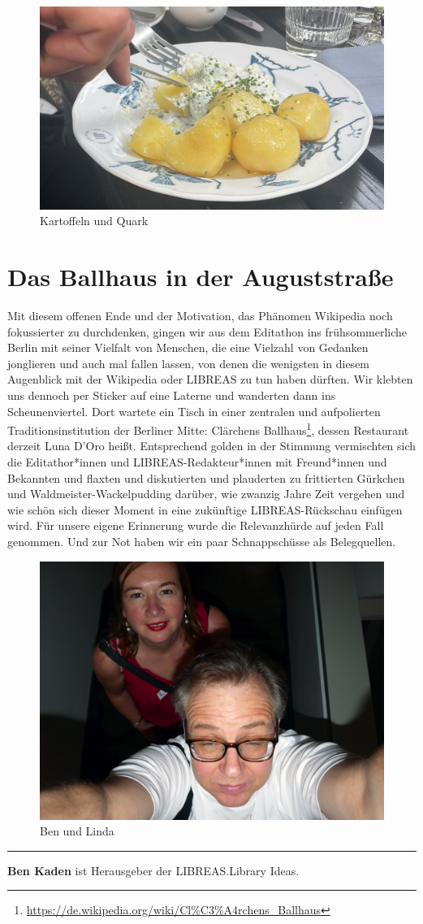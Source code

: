 \documentclass[a4paper,
fontsize=11pt,
oneside,
numbers=noperiodatend,
parskip=half-,
bibliography=totoc,
final
]{scrartcl}
\begin{document}
\begin{figure}[H]
\centering
\includegraphics[width=.7\textwidth]{img/Abb3.jpg}
\caption{Kartoffeln und Quark}
\end{figure}

\pagebreak

\section{Das Ballhaus in der
Auguststraße}\label{das-ballhaus-in-der-auguststrauxdfe}

Mit diesem offenen Ende und der Motivation, das Phänomen Wikipedia noch
fokussierter zu durchdenken, gingen wir aus dem Editathon ins
frühsommerliche Berlin mit seiner Vielfalt von Menschen, die eine
Vielzahl von Gedanken jonglieren und auch mal fallen lassen, von denen
die wenigsten in diesem Augenblick mit der Wikipedia oder LIBREAS zu tun
haben dürften. Wir klebten uns dennoch per Sticker auf eine Laterne und
wanderten dann ins Scheunenviertel. Dort wartete ein Tisch in einer
zentralen und aufpolierten Traditionsinstitution der Berliner Mitte:
Clärchens Ballhaus\footnote{\url{https://de.wikipedia.org/wiki/Cl\%C3\%A4rchens_Ballhaus}},
dessen Restaurant derzeit Luna D'Oro heißt. Entsprechend golden in der
Stimmung vermischten sich die Editathor*innen und
LIBREAS-Redakteur*innen mit Freund*innen und Bekannten und flaxten und
diskutierten und plauderten zu frittierten Gürkchen und
Waldmeister-Wackelpudding darüber, wie zwanzig Jahre Zeit vergehen und
wie schön sich dieser Moment in eine zukünftige LIBREAS-Rückschau
einfügen wird. Für unsere eigene Erinnerung wurde die Relevanzhürde auf
jeden Fall genommen. Und zur Not haben wir ein paar Schnappschüsse als
Belegquellen.

\begin{figure}[H]
\centering
\includegraphics[width=.7\textwidth]{img/Abb4.jpg}
\caption{Ben und Linda}
\end{figure}

\begin{center}\rule{0.5\linewidth}{0.5pt}\end{center}

\textbf{Ben Kaden} ist Herausgeber der LIBREAS.Library Ideas.
\end{document}
